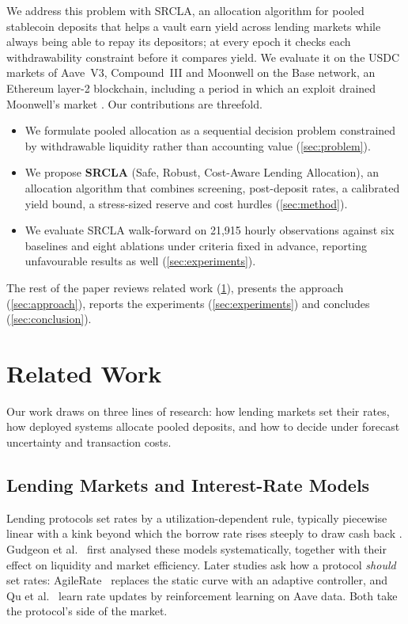 \documentclass[sigconf]{acmart}
\begin{document}
We address this problem with SRCLA, an allocation algorithm for pooled stablecoin deposits that helps a vault earn yield across lending markets while always being able to repay its depositors; at every epoch it checks each withdrawability constraint before it compares yield. We evaluate it on the USDC markets of Aave~V3, Compound~III and Moonwell on the Base network, an Ethereum layer-2 blockchain, including a period in which an exploit drained Moonwell's market \citep{moonwellpostmortem}. Our contributions are threefold.
\begin{itemize}
  \item We formulate pooled allocation as a sequential decision problem constrained by withdrawable liquidity rather than accounting value (\cref{sec:problem}).
  \item We propose \textbf{SRCLA} (Safe, Robust, Cost-Aware Lending Allocation), an allocation algorithm that combines screening, post-deposit rates, a calibrated yield bound, a stress-sized reserve and cost hurdles (\cref{sec:method}).
  \item We evaluate SRCLA walk-forward on 21,915 hourly observations against six baselines and eight ablations under criteria fixed in advance, reporting unfavourable results as well (\cref{sec:experiments}).
\end{itemize}
The rest of the paper reviews related work (\cref{sec:related}), presents the approach (\cref{sec:approach}), reports the experiments (\cref{sec:experiments}) and concludes (\cref{sec:conclusion}).

\section{Related Work}
\label{sec:related}

Our work draws on three lines of research: how lending markets set their rates, how deployed systems allocate pooled deposits, and how to decide under forecast uncertainty and transaction costs.

\subsection{Lending Markets and Interest-Rate Models}

Lending protocols set rates by a utilization-dependent rule, typically piecewise linear with a kink beyond which the borrow rate rises steeply to draw cash back \citep{aaveirm,compoundrates,moonwellcurves}. Gudgeon et al.~\citep{gudgeon2020defi} first analysed these models systematically, together with their effect on liquidity and market efficiency. Later studies ask how a protocol \emph{should} set rates: AgileRate~\citep{bastankhah2024agilerate} replaces the static curve with an adaptive controller, and Qu et al.~\citep{qu2025rules} learn rate updates by reinforcement learning on Aave data. Both take the protocol's side of the market.
\end{document}
